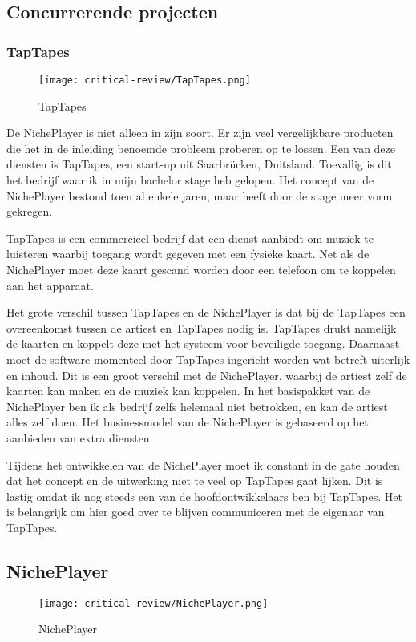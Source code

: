 \subsection{Concurrerende projecten}
\subsubsection*{TapTapes}
\begin{wrapfigure}{r}{0.25\textwidth}
    \centering
    \texttt{[image: critical-review/TapTapes.png]}
    \caption{TapTapes}
    \label{fig:critical-review:TapTapes}
\end{wrapfigure}
De NichePlayer is niet alleen in zijn soort. Er zijn veel vergelijkbare producten die het in de inleiding benoemde probleem proberen op te lossen. Een van deze diensten is TapTapes, een start-up uit Saarbrücken, Duitsland. Toevallig is dit het bedrijf waar ik in mijn bachelor stage heb gelopen. Het concept van de NichePlayer bestond toen al enkele jaren, maar heeft door de stage meer vorm gekregen.

TapTapes is een commercieel bedrijf dat een dienst aanbiedt om muziek te luisteren waarbij toegang wordt gegeven met een fysieke kaart. Net als de NichePlayer moet deze kaart gescand worden door een telefoon om te koppelen aan het apparaat.

Het grote verschil tussen TapTapes en de NichePlayer is dat bij de TapTapes een overeenkomst tussen de artiest en TapTapes nodig is. TapTapes drukt namelijk de kaarten  en koppelt deze met het systeem voor beveiligde toegang. Daarnaast moet de software momenteel door TapTapes ingericht worden wat betreft uiterlijk en inhoud. Dit is een groot verschil met de NichePlayer, waarbij de artiest zelf de kaarten kan maken en de muziek kan koppelen. In het basispakket van de NichePlayer ben ik als bedrijf zelfs helemaal niet betrokken, en kan de artiest alles zelf doen. Het businessmodel van de NichePlayer is gebaseerd op het aanbieden van extra diensten.

Tijdens het ontwikkelen van de NichePlayer moet ik constant in de gate houden dat het concept en de uitwerking niet te veel op TapTapes gaat lijken. Dit is lastig omdat ik nog steeds een van de hoofdontwikkelaars ben bij TapTapes. Het is belangrijk om hier goed over te blijven communiceren met de eigenaar van TapTapes.

\subsection{NichePlayer}
\begin{wrapfigure}{r}{0.25\textwidth}
    \centering
    \texttt{[image: critical-review/NichePlayer.png]}
    \caption{NichePlayer}
    \label{fig:critical-review:NichePlayer}
\end{wrapfigure}


